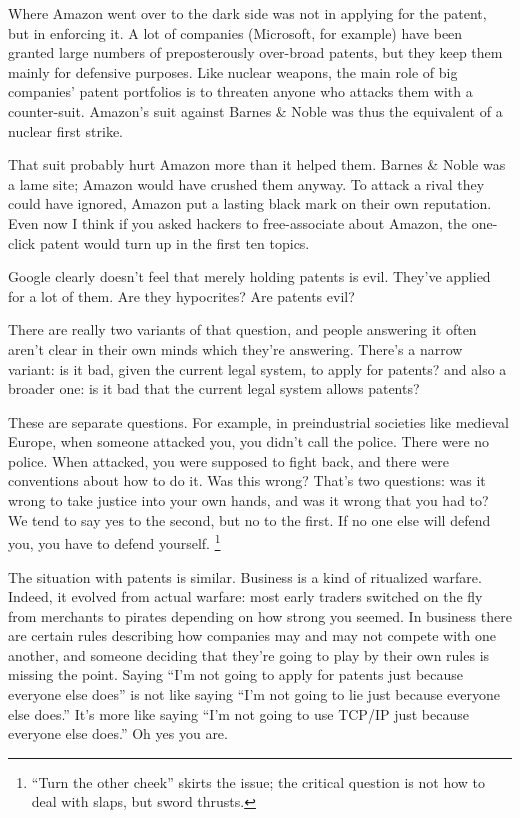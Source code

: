 Where Amazon went over to the dark side was not in applying for the
patent, but in enforcing it. A lot of companies (Microsoft, for example)
have been granted large numbers of preposterously over-broad patents,
but they keep them mainly for defensive purposes. Like nuclear weapons,
the main role of big companies' patent portfolios is to threaten anyone
who attacks them with a counter-suit. Amazon's suit against Barnes \&
Noble was thus the equivalent of a nuclear first strike.

That suit probably hurt Amazon more than it helped them. Barnes \& Noble
was a lame site; Amazon would have crushed them anyway. To attack a
rival they could have ignored, Amazon put a lasting black mark on their
own reputation. Even now I think if you asked hackers to free-associate
about Amazon, the one-click patent would turn up in the first ten
topics.

Google clearly doesn't feel that merely holding patents is evil. They've
applied for a lot of them. Are they hypocrites? Are patents evil?

There are really two variants of that question, and people answering it
often aren't clear in their own minds which they're answering. There's a
narrow variant: is it bad, given the current legal system, to apply for
patents? and also a broader one: is it bad that the current legal system
allows patents?

These are separate questions. For example, in preindustrial societies
like medieval Europe, when someone attacked you, you didn't call the
police. There were no police. When attacked, you were supposed to fight
back, and there were conventions about how to do it. Was this wrong?
That's two questions: was it wrong to take justice into your own hands,
and was it wrong that you had to? We tend to say yes to the second, but
no to the first. If no one else will defend you, you have to defend
yourself. \footnote{``Turn the other cheek'' skirts the issue; the critical question
is not how to deal with slaps, but sword thrusts.}

The situation with patents is similar. Business is a kind of ritualized
warfare. Indeed, it evolved from actual warfare: most early traders
switched on the fly from merchants to pirates depending on how strong
you seemed. In business there are certain rules describing how companies
may and may not compete with one another, and someone deciding that
they're going to play by their own rules is missing the point. Saying
``I'm not going to apply for patents just because everyone else does''
is not like saying ``I'm not going to lie just because everyone else
does.'' It's more like saying ``I'm not going to use TCP/IP just because
everyone else does.'' Oh yes you are.

